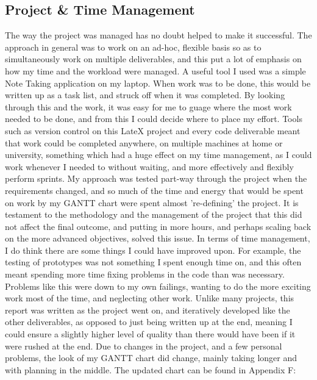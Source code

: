\subsection{Project \& Time Management}
The way the project was managed has no doubt helped to make it successful. The approach in general was to work on an ad-hoc, flexible basis so as to simultaneously work on multiple deliverables, and this put a lot of emphasis on how my time and the workload were managed. 
A useful tool I used was a simple Note Taking application on my laptop. When work was to be done, this would be written up as a task list, and struck off when it was completed. By looking through this and the work, it was easy for me to guage where the most work needed to be done, and from this I could decide where to place my effort. 
Tools such as version control on this LateX project and every code deliverable meant that work could be completed anywhere, on multiple machines at home or university, something which had a huge effect on my time management, as I could work whenever I needed to without waiting, and more effectively and flexibly perform sprints.
My approach was tested part-way through the project when the requirements changed, and so much of the time and energy that would be spent on work by my GANTT chart were spent almost 're-defining' the project. It is testament to the methodology and the management of the project that this did not affect the final outcome, and putting in more hours, and perhaps scaling back on the more advanced objectives, solved this issue. 
In terms of time management, I do think there are some things I could have improved upon. For example, the testing of prototypes was not something I spent enough time on, and this often meant spending more time fixing problems in the code than was necessary. Problems like this were down to my own failings, wanting to do the more exciting work most of the time, and neglecting other work. Unlike many projects, this report was written as the project went on, and iteratively developed like the other deliverables, as opposed to just being written up at the end, meaning I could ensure a slightly higher level of quality than there would have been if it were rushed at the end. 
Due to changes in the project, and a few personal problems, the look of my GANTT chart did change, mainly taking longer and with planning in the middle. The updated chart can be found in Appendix F: 


